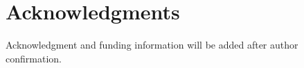 \section*{Acknowledgments}

Acknowledgment and funding information will be added after author confirmation.
